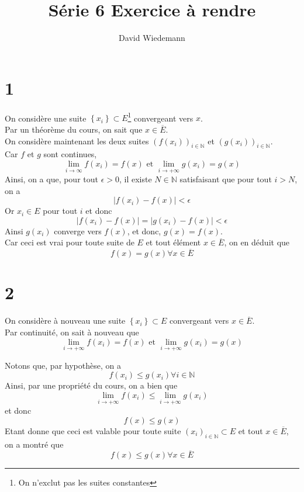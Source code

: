 \documentclass[11pt, a4paper]{article}
\begin{document}
\title{Série 6 Exercice à rendre}
\author{David Wiedemann}
\maketitle
\section*{1}
On considère une suite $ \left\{ x_i \right\} \subset E$\footnote{On n'exclut pas les suites constantes} convergeant vers $x$.\\
Par un théorème du cours, on sait que $x \in \overline{E}$.\\
On considère maintenant les deux suites $( f( x_i) )_{i \in \mathbb{N}}  $ et $( g( x_{i} ) )_{i \in \mathbb{N}}$.\\
Car $f$ et $g$ sont continues, 
\[ 
	\lim_{i \to \infty } f( x_i) = f( x) \text{ et } \lim_{i \to  + \infty} g( x_i) = g( x) 
\]
Ainsi, on a que, pour tout $\epsilon>0$, il existe $N \in \mathbb{N}$ satisfaisant que pour tout $i>N$, on a
\[ 
	|f( x_i) - f( x)| < \epsilon
\]
Or $x_i \in E$ pour tout $i$ et donc
\[ 
	|f( x_i) - f( x)| =|g( x_i) - f( x)| <\epsilon
\]
Ainsi $g( x_i) $ converge vers $f( x) $, et donc, $g( x) = f( x) $.\\
Car ceci est vrai pour toute suite de $E$ et tout élément $x \in \overline{E}$, on en déduit que 
\[ 
	f( x) =g( x)  \forall x \in \overline{E}
\]

\section*{2}
On considère à nouveau une suite $ \left\{ x_i \right\} \subset E$ convergeant vers $x \in \overline{E}$.\\
Par continuité, on sait à nouveau que 
\[ 
	\lim_{i \to +\infty } f( x_i) = f( x) \text{ et } \lim_{i \to  + \infty} g( x_i) = g( x) 
\]

Notons que, par hypothèse, on a
\[ 
	f( x_i) \leq g( x_i) \forall i \in \mathbb{N}
\]
Ainsi, par une propriété du cours, on a bien que
\[ 
	\lim_{i \to  + \infty} f( x_i) \leq \lim_{i \to  + \infty} g( x_i) 
\]
et donc
\[ 
	f( x) \leq g( x) 
\]
Etant donne que ceci est valable pour toute suite  $ ( x_i)_{i \in \mathbb{N}} \subset E$ et tout $x \in \overline{E}$, on a montré que
\[ 
	f( x) \leq g( x) \forall x \in \overline{E}
\]
\end{document}
